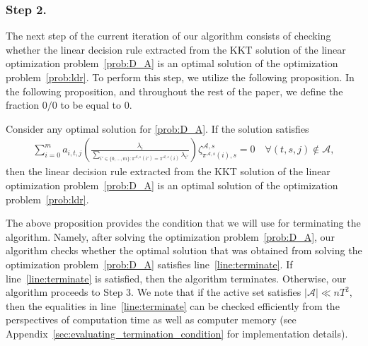 \documentclass[nonblindrev,mnsc]{informs3} %
\begin{document}
\subsubsection*{Step 2.} The next step of the current iteration of our algorithm consists of checking whether the linear decision rule extracted from the KKT solution of the linear optimization problem~\eqref{prob:D_A} is an 
 optimal solution of the optimization problem~\eqref{prob:ldr}. To perform this step, we utilize the following proposition. In the following proposition, and throughout the rest of the paper,  we define the fraction $0/0$ to be equal to $0$. 
   \begin{proposition} \label{prop:terminate}
Consider any optimal solution for \eqref{prob:D_A}. If the solution satisfies
\begin{align}
 \sum_{i=0}^m   a_{i,t,j} \left( \frac{\lambda_i}{\sum_{i' \in \{0,\ldots,m\}: \pi^{\mathcal{A},s}(i') = \pi^{\mathcal{A},s}(i)} \lambda_{i'}} \right) \zeta^{\mathcal{A},s}_{\pi^{\mathcal{A},s}(i),s} = 0 \quad \forall (t,s,j) \notin \mathcal{A}, \label{line:terminate}
 \end{align} 
then the linear decision rule extracted from the KKT solution of the linear optimization problem~\eqref{prob:D_A} is an 
 optimal solution of the optimization problem~\eqref{prob:ldr}. 
 \end{proposition}
 The above proposition provides the condition that we will use for terminating the algorithm.  
Namely, after solving the optimization problem~\eqref{prob:D_A}, our algorithm checks whether the optimal solution that was obtained from solving the optimization problem~\eqref{prob:D_A} satisfies line~\eqref{line:terminate}. If line~\eqref{line:terminate} is satisfied, then the algorithm terminates. Otherwise, our algorithm proceeds to Step 3. We note that if the active set satisfies $| \mathcal{A}| \ll nT^2$, then the equalities in line~\eqref{line:terminate} can be checked efficiently from the perspectives of computation time as well as computer memory (see Appendix~\ref{sec:evaluating_termination_condition} for implementation details). 
 
\end{document}
